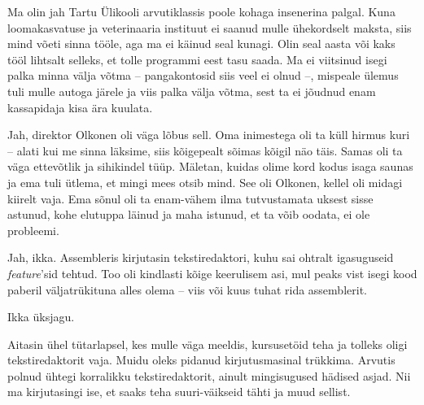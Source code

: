 
Ma olin jah Tartu Ülikooli arvutiklassis poole kohaga insenerina palgal. 
Kuna loomakasvatuse ja veterinaaria instituut ei saanud mulle 
ühekordselt maksta, siis mind võeti sinna tööle, aga ma ei käinud 
seal kunagi. Olin seal aasta või kaks tööl lihtsalt selleks, et tolle 
programmi eest tasu saada. Ma ei viitsinud isegi palka minna välja 
võtma -- pangakontosid siis veel ei olnud --, mispeale ülemus tuli mulle autoga järele ja 
viis palka välja võtma, sest ta ei jõudnud enam kassapidaja kisa ära 
kuulata.


Jah, direktor Olkonen oli väga lõbus sell. Oma inimestega oli ta küll hirmus 
kuri -- alati kui me sinna läksime, siis kõigepealt sõimas kõigil näo täis. 
Samas oli ta väga ettevõtlik ja sihikindel tüüp. Mäletan, kuidas olime kord kodus isaga saunas ja 
ema tuli ütlema, et mingi mees otsib mind. See oli Olkonen, kellel
oli midagi kiirelt vaja. Ema sõnul oli ta enam-vähem ilma 
tutvustamata uksest sisse astunud, kohe elutuppa läinud ja maha istunud, et ta 
võib oodata, ei ole probleemi.


Jah, ikka. Assembleris kirjutasin tekstiredaktori, kuhu sai 
ohtralt igasuguseid \emph{feature}'sid tehtud. Too oli kindlasti kõige 
keerulisem asi, mul peaks vist isegi kood paberil väljatrükituna 
alles olema -- viis või kuus tuhat rida assemblerit. 


Ikka üksjagu. 


Aitasin ühel tütarlapsel, kes mulle väga meeldis, kursusetöid teha 
ja tolleks oligi tekstiredaktorit vaja. Muidu oleks pidanud 
kirjutusmasinal trükkima. Arvutis polnud ühtegi korralikku tekstiredaktorit, ainult mingisugused hädised asjad. Nii ma kirjutasingi ise,
et saaks teha suuri-väikseid tähti ja muud sellist.


